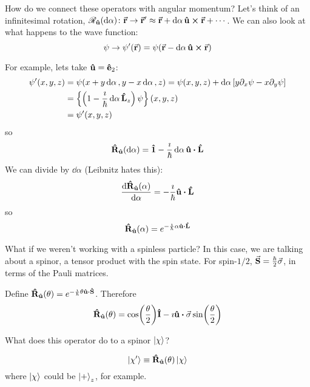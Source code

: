 \documentclass[a4paper,twoside,master.tex]{subfiles}
\begin{document}
How do we connect these operators with angular momentum? Let's think of an infinitesimal rotation, $ \mathscr{R}_{ \vu{u}}(\dd{\alpha})\colon \va{r} \to \va{r}' \approx \va{r} + \dd{\alpha} \vu{u} \cross \va{r} + \cdots $. We can also look at what happens to the wave function:
\begin{equation}
    \psi \to \psi'( \va{r}) = \psi( \va{r} - \dd{\alpha} \vu{u} \cross \va{r}) 
\end{equation}

For example, lets take $ \vu{u} = \vu{e}_2 $:
\begin{align}
    \psi'(x,y,z) &= \psi(x + y \dd{\alpha}, y - x \dd{\alpha}, z) = \psi(x,y,z) + \dd{\alpha} \left[ y \partial_x \psi - x \partial_y \psi \right] \\
    &= \left\{ \left( 1 - \frac{\imath}{\hbar} \dd{\alpha} \vu{L}_z \right) \psi \right\}(x,y,z) \\
    &= \psi'(x,y,z)
\end{align}
so
\begin{equation}
    \vu{R}_{ \vu{u}}(\dd{\alpha}) = \vu{1} - \frac{\imath}{\hbar} \dd{\alpha} \vu{u} \vdot \vu{L}
\end{equation}
We can divide by $ \dd{\alpha} $ (Leibnitz hates this):
\begin{equation}
    \dv{ \vu{R}_{ \vu{u}}(\alpha)}{\alpha} = - \frac{\imath}{\hbar} \vu{u} \vdot \vu{L}
\end{equation}
so
\begin{equation}
    \vu{R}_{ \vu{u}}(\alpha) = e^{- \frac{\imath}{\hbar} \alpha \vu{u} \vdot \vu{L}}
\end{equation}

What if we weren't working with a spinless particle? In this case, we are talking about a spinor, a tensor product with the spin state. For spin-$ 1/2 $, $ \va{S} = \frac{\hbar}{2} \va{\sigma} $, in terms of the Pauli matrices.

Define $ \vu{R}_{ \vu{u}}(\theta) = e^{- \frac{\imath}{\hbar} \theta \vu{u} \vdot \vu{S}} $. Therefore
\begin{equation}
    \vu{R}_{ \vu{u}}(\theta) = \cos(\frac{\theta}{2}) \vu{I} - \imath \vu{u} \vdot \va{\sigma} \sin(\frac{\theta}{2})
\end{equation}

What does this operator do to a spinor $\ket{\chi} $?

\begin{equation}
    \ket{\chi'} \equiv \vu{R}_{ \vu{u}}(\theta)\ket{\chi}
\end{equation}
where $\ket{\chi} $ could be $\ket{+}_z $, for example.
\end{document}

